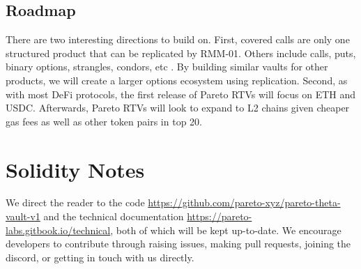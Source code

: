 \documentclass[hidelinks, 12pt]{article}
\begin{document}
\subsection{Roadmap}

There are two interesting directions to build on. First, covered calls are only one structured product that can be replicated by RMM-01. Others include calls, puts, binary options, strangles, condors, etc \cite{sterrett2022replicating}. By building similar vaults for other products, we will create a larger options ecosystem using replication. Second, as with most DeFi protocols, the first release of Pareto RTVs will focus on ETH and USDC. Afterwards, Pareto RTVs will look to expand to L2 chains given cheaper gas fees as well as other token pairs in top 20.




\appendix

\section{Solidity Notes}

We direct the reader to the code \url{https://github.com/pareto-xyz/pareto-theta-vault-v1} and the technical documentation \url{https://pareto-labs.gitbook.io/technical}, both of which will be kept up-to-date. We encourage developers to contribute through raising issues, making pull requests, joining the discord, or getting in touch with us directly.
\end{document}
